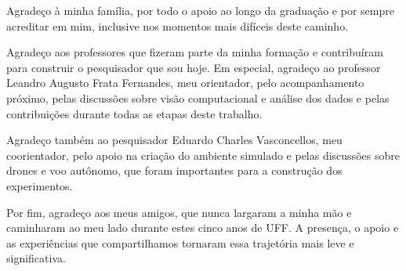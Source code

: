 \begin{agradecimentos}
Agradeço à minha família, por todo o apoio ao longo da graduação e por sempre acreditar em mim, inclusive nos momentos mais difíceis deste caminho.

Agradeço aos professores que fizeram parte da minha formação e contribuíram para construir o pesquisador que sou hoje. Em especial, agradeço ao professor Leandro Augusto Frata Fernandes, meu orientador, pelo acompanhamento próximo, pelas discussões sobre visão computacional e análise dos dados e pelas contribuições durante todas as etapas deste trabalho.

Agradeço também ao pesquisador Eduardo Charles Vasconcellos, meu coorientador, pelo apoio na criação do ambiente simulado e pelas discussões sobre drones e voo autônomo, que foram importantes para a construção dos experimentos.

Por fim, agradeço aos meus amigos, que nunca largaram a minha mão e caminharam ao meu lado durante estes cinco anos de UFF. A presença, o apoio e as experiências que compartilhamos tornaram essa trajetória mais leve e significativa.
\end{agradecimentos}
